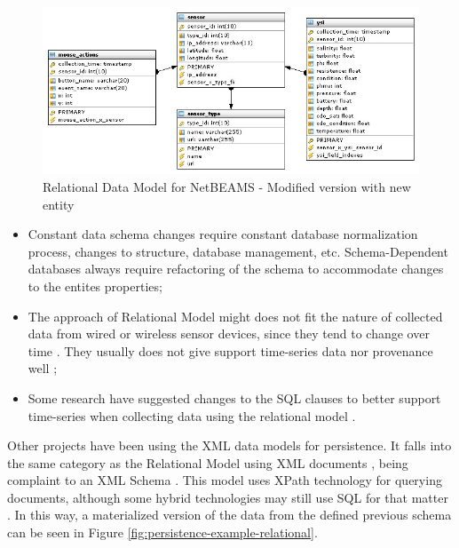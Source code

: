 \begin{figure}
  \centering
  \includegraphics[scale=0.65]{../diagrams/Relational-Model-Addition-Modified}
  \caption{Relational Data Model for NetBEAMS - Modified version with new
  entity}
  \label{fig:Relational-Model-Addition-Modified}
\end{figure}

\begin{itemize}
  \item Constant data schema changes require constant database normalization
  process, changes to structure, database management, etc. Schema-Dependent 
  databases always require refactoring of the schema to accommodate changes to
  the entites properties;
  \item The approach of Relational Model might does not fit the nature of
  collected data from wired or wireless sensor devices, since they tend to
  change over time \cite{db-is-rdbs-dommed}. They usually does not give
  support time-series data nor provenance well \cite{sn-provenance};
  \item Some research have suggested changes to the SQL clauses to better
  support time-series when collecting data using the relational model 
  \cite{sn-db-newop}.
\end{itemize}

Other projects have been using the XML data models for persistence. It falls
into the same category as the Relational Model using XML documents \cite{xml},
being complaint to an XML Schema \cite{xml-schema}. This model uses XPath
\cite{xml-xpath} technology for querying documents, although some hybrid
technologies may still use SQL \cite{sql} for that matter \cite{db2}. In this
way, a materialized version of the data from the defined previous schema can be
seen in Figure \ref{fig:persistence-example-relational}.

